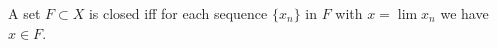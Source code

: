 A set $F \subset X$ is closed iff for each sequence $\{x_n\}$ in $F$ with $x = \lim x_n$ we have $x \in F$.
